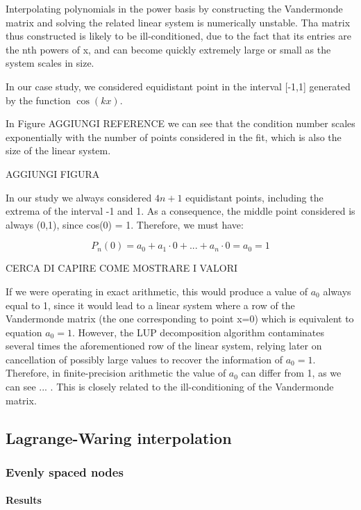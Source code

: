 \documentclass[a4paper,11]{article}
\begin{document}
Interpolating polynomials in the power basis by constructing the 
Vandermonde matrix and solving the related linear system is numerically
unstable. Tha matrix thus constructed is likely to be ill-conditioned,
due to the fact that its entries are the nth powers of x, and can become
quickly extremely large or small as the system scales in size.

In our case study, we considered equidistant point in the interval [-1,1]
generated by the function $\cos(kx)$.

In Figure AGGIUNGI REFERENCE we can see that the condition number scales
exponentially with the number of points considered in the fit, which is also the 
size of the linear system.

AGGIUNGI FIGURA

In our study we always considered $4n+1$ equidistant points, including the 
extrema of the interval -1 and 1. As a consequence, the middle point considered 
is always (0,1), since cos(0) = 1. Therefore, we must have:

\[
	P_{n}(0) = a_{0}+ a_{1}\cdot 0 + ... + a_{n}\cdot 0 = a_{0} = 1
\]



CERCA DI CAPIRE COME MOSTRARE I VALORI

If we were operating in exact arithmetic, this would produce a value of 
$a_{0}$ always equal to 1, since it would lead to a linear system where a row
of the Vandermonde matrix (the one corresponding to point x=0) which is 
equivalent to equation $a_{0}=1$. However, the LUP decomposition algorithm 
contaminates several times the aforementioned row of the linear system, relying
later on cancellation of possibly large values to recover the information of
$a_{0}=1$. Therefore, in finite-precision arithmetic the value of $a_{0}$ can 
differ from 1, as we can see ... . This is closely related to the 
ill-conditioning of the Vandermonde matrix.

\subsection{Lagrange-Waring interpolation}

\subsubsection{Evenly spaced nodes}

\paragraph{Results}
\end{document}
